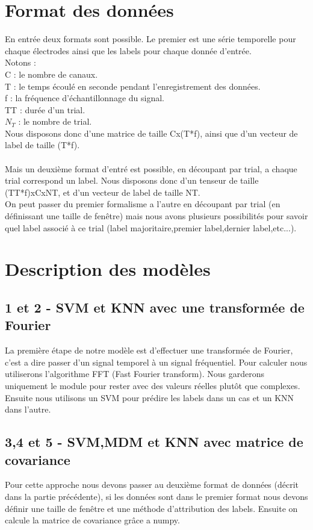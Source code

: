 \documentclass{article}[12pt]
\begin{document}
\section{Format des données}
En entrée deux formats sont possible. Le premier est une série temporelle pour chaque électrodes ainsi que les labels pour chaque donnée d'entrée.\\
Notons :\\
C : le nombre de canaux.\\
T : le temps écoulé en seconde pendant l'enregistrement des données.\\
f : la fréquence d’échantillonnage du signal.\\
TT : durée d'un trial.\\
$N_{T}$ : le nombre de trial.\\
Nous disposons donc d'une matrice de taille Cx(T*f), ainsi que d'un vecteur de label de taille (T*f).\\
\\
Mais un deuxième format d'entré est possible, en découpant par trial, a chaque trial correspond un label. Nous disposons donc d'un tenseur de taille (TT*f)xCxNT, et d'un vecteur de label de taille NT.\\
On peut passer du premier formalisme a l'autre en découpant par trial (en définissant une taille de fenêtre) mais nous avons plusieurs possibilités pour savoir quel label associé à ce trial (label majoritaire,premier label,dernier label,etc...).\\
\section{Description des modèles}
\subsection{1 et 2 - SVM et KNN avec une transformée de Fourier}
La première étape de notre modèle est d'effectuer une transformée de Fourier, c'est a dire passer d'un signal temporel à un signal fréquentiel. Pour calculer nous utiliserons l'algorithme FFT (Fast Fourier transform). Nous garderons uniquement le module pour rester avec des valeurs réelles plutôt que complexes. Ensuite nous utilisons un SVM pour prédire les labels dans un cas et un KNN dans l'autre.
\subsection{3,4 et 5 - SVM,MDM et KNN avec matrice de covariance }
Pour cette approche nous devons passer au deuxième format de données (décrit dans la partie précédente), si les données sont dans le premier format nous devons définir une taille de fenêtre et une méthode d'attribution des labels. Ensuite on calcule la matrice de covariance grâce a numpy.
\end{document}
